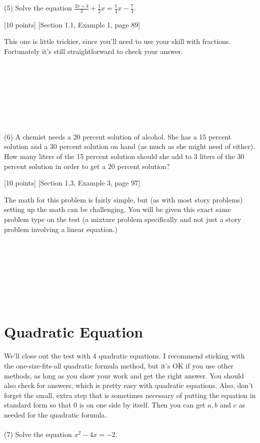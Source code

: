\documentclass{article}
\begin{document}
(5) Solve the equation $\frac{2x+4}{3} + \frac{1}{2}x = \frac{1}{4}x-\frac{7}{3}$.

[10 points] [Section 1.1, Example 1, page 89]

This one is little trickier, since you'll need to use your skill with fractions.  Fortunately it's still straightforward to check your answer.\\\\\\\\\\\\\\\

(6)  A chemist needs a 20 percent solution of alcohol. She has a 15 percent solution and a 30 percent solution on hand (as much as she might need of either). How many liters of the 15 percent solution should she add to 3 liters of the 30 percent solution in order to get a 20 percent solution?

[10 points] [Section 1.3, Example 3, page 97]

The math for this problem is fairly simple, but (as with most story problems) setting up the math can be challenging. You will be given this exact same problem type on the test (a mixture problem specifically and not just a story problem involving a linear equation.)\\\\\\\\\\\\\\\

\section{Quadratic Equation}
We'll close out the test with 4 quadratic equations. I recommend sticking with the one-size-fits-all quadratic formula method, but it's OK if you use other methods, as long as you show your work and get the right answer. You should also check for answers, which is pretty easy with quadratic equations. Also, don't forget the small, extra step that is sometimes necessary of putting the equation in standard form so that $0$ is on one side by itself. Then you can get $a,b$ and $c$ as needed for the quadratic formula.\\\\

(7) Solve the equation $x^2 -4x  = -2$.
\end{document}
